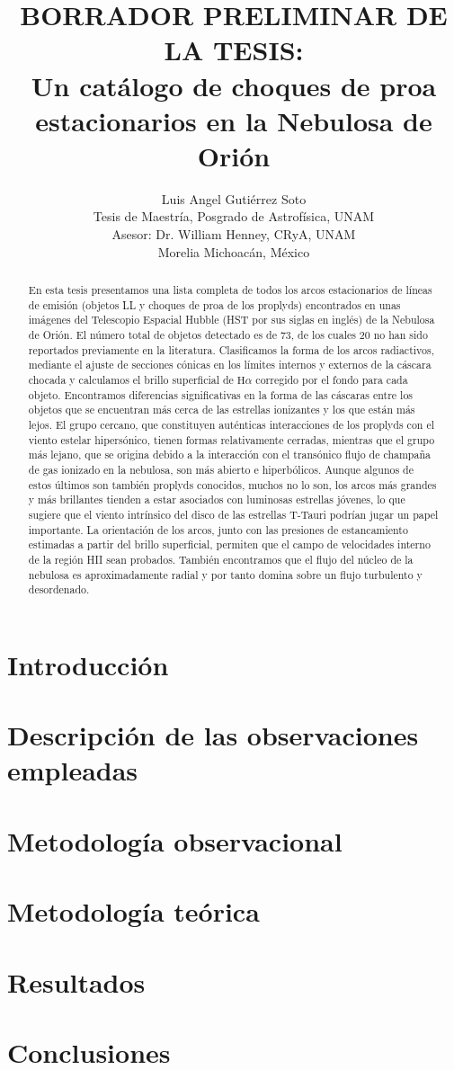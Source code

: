 \documentclass{report}
\title{BORRADOR PRELIMINAR DE LA TESIS:\\
Un catálogo de choques de proa estacionarios en la Nebulosa de Orión}
\author{
  Luis Angel Gutiérrez Soto\\
  Tesis de Maestría, Posgrado de Astrofísica, UNAM\\
  Asesor: Dr. William Henney, CRyA, UNAM\\
  Morelia Michoacán, México
  }
\newcommand\ha{\ensuremath{\mathrm{H}\alpha}}
\begin{document}
\maketitle

\tableofcontents

\begin{abstract}
 En esta tesis presentamos una lista completa de todos los arcos estacionarios de líneas de emisión (objetos LL y choques de proa de los proplyds) encontrados en unas imágenes  del Telescopio Espacial Hubble (HST por sus siglas en inglés) de la Nebulosa de Orión. El número total de objetos detectado es de 73, de los cuales 20 no han sido reportados previamente en la literatura. Clasificamos la forma de los arcos radiactivos, mediante el ajuste de secciones cónicas en los límites internos y externos de la cáscara chocada y calculamos el brillo superficial de \ha{} corregido por el fondo para cada objeto. Encontramos diferencias significativas en la forma de las cáscaras entre los objetos que se encuentran más cerca de las estrellas ionizantes y los que están más lejos. El grupo cercano, que constituyen auténticas interacciones de los proplyds con el viento estelar hipersónico, tienen formas relativamente cerradas, mientras que el grupo más lejano, que se origina debido a la interacción con el transónico flujo de champaña de gas ionizado en la nebulosa, son más abierto e hiperbólicos. Aunque algunos de estos últimos son también proplyds conocidos, muchos no lo son, los arcos más grandes y más brillantes tienden a estar asociados con luminosas estrellas jóvenes, lo que sugiere que el viento intrínsico del disco de las estrellas T-Tauri podrían jugar un papel importante. La orientación de los arcos, junto con las presiones de estancamiento estimadas a partir del brillo superficial, permiten que el campo de velocidades interno de la región HII sean probados. También  encontramos que el flujo del núcleo de la nebulosa es aproximadamente radial y por tanto domina sobre un flujo turbulento y desordenado.
\end{abstract}


\chapter{Introducción}

\chapter{Descripción de las observaciones empleadas}

\chapter{Metodología observacional}

\chapter{Metodología teórica}

\chapter{Resultados}

\chapter{Conclusiones}



\end{document}
